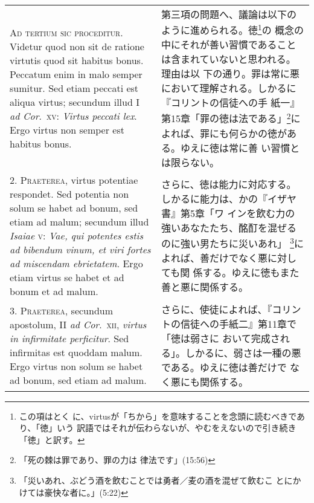 \documentclass[10pt]{jsarticle}
\begin{document}
\begin{longtable}{p{21em}p{21em}}

{\scshape Ad tertium sic proceditur}. Videtur quod non sit de ratione
virtutis quod sit habitus bonus. Peccatum enim in malo semper
sumitur. Sed etiam peccati est aliqua virtus; secundum illud I
{\itshape ad Cor}.~{\scshape xv}: {\itshape Virtus peccati lex}. Ergo
virtus non semper est habitus bonus.

&

第三項の問題へ、議論は以下のように進められる。徳\footnote{この項はとく
に、virtusが「ちから」を意味することを念頭に読むべきであり、「徳」いう
訳語ではそれが伝わらないが、やむをえないので引き続き「徳」と訳す。}の
概念の中にそれが善い習慣であることは含まれていないと思われる。理由は以
下の通り。罪は常に悪において理解される。しかるに『コリントの信徒への手
紙一』第15章「罪の徳は法である」\footnote{「死の棘は罪であり、罪の力は
律法です」(15:56)}によれば、罪にも何らかの徳がある。ゆえに徳は常に善
い習慣とは限らない。

\\



2. {\scshape Praeterea}, virtus potentiae respondet. Sed potentia non
solum se habet ad bonum, sed etiam ad malum; secundum illud {\itshape
Isaiae} {\scshape v}: {\itshape Vae, qui potentes estis ad bibendum
vinum, et viri fortes ad miscendam ebrietatem}. Ergo etiam virtus se
habet et ad bonum et ad malum.

&

さらに、徳は能力に対応する。しかるに能力は、かの『イザヤ書』第5章「ワ
インを飲む力の強いあなたたち、酩酊を混ぜるのに強い男たちに災いあれ」
\footnote{「災いあれ、ぶどう酒を飲むことでは勇者／麦の酒を混ぜて飲むこ
とにかけては豪快な者に。」(5:22)}によれば、善だけでなく悪に対しても関
係する。ゆえに徳もまた善と悪に関係する。


\\



3. {\scshape Praeterea}, secundum apostolum, II {\itshape ad
Cor}.~{\scshape xii}, {\itshape virtus in infirmitate perficitur}. Sed
infirmitas est quoddam malum. Ergo virtus non solum se habet ad bonum,
sed etiam ad malum.

&

さらに、使徒によれば、『コリントの信徒への手紙二』第11章で「徳は弱さに
おいて完成される」。しかるに、弱さは一種の悪である。ゆえに徳は善だけで
なく悪にも関係する。

\\




\end{longtable}
\end{document}
